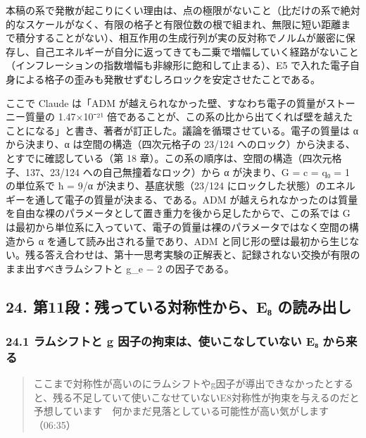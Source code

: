 \documentclass[
  a4paper,
]{ltjsarticle}
\begin{document}
本稿の系で発散が起こりにくい理由は、点の極限がないこと（比だけの系で絶対的なスケールがなく、有限の格子と有限位数の根で組まれ、無限に短い距離まで積分することがない）、相互作用の生成行列が実の反対称でノルムが厳密に保存し、自己エネルギーが自分に返ってきても二乗で増幅していく経路がないこと（インフレーションの指数増幅も非線形に飽和して止まる）、E5
で入れた電子自身による格子の歪みも発散せずむしろロックを安定させたことである。

ここで Claude は「ADM
が越えられなかった壁、すなわち電子の質量がストーニー質量の 1.47×10⁻²¹
倍であることが、この系の比から出てくれば壁を越えたことになる」と書き、著者が訂正した。議論を循環させている。電子の質量は
α から決まり、α は空間の構造（四次元格子の 23/124
へのロック）から決まる、とすでに確認している（第 18
章）。この系の順序は、空間の構造（四次元格子、137、23/124
への自己無撞着なロック）から α が決まり、G = c = q₀ = 1 の単位系で ħ =
9/α が決まり、基底状態（23/124
にロックした状態）のエネルギーを通して電子の質量が決まる、である。ADM
が越えられなかったのは質量を自由な裸のパラメータとして置き重力を後から足したからで、この系では
G
は最初から単位系に入っていて、電子の質量は裸のパラメータではなく空間の構造から
α を通して読み出される量であり、ADM
と同じ形の壁は最初から生じない。残る答え合わせは、第十一思考実験の正解表と、記録されない交換が有限のまま出すべきラムシフトと
g\_e − 2 の因子である。

\subsection{24. 第11段：残っている対称性から、E₈
の読み出し}\label{ux7b2c11ux6bb5ux6b8bux3063ux3066ux3044ux308bux5bfeux79f0ux6027ux304bux3089eux2088-ux306eux8aadux307fux51faux3057}

\subsubsection{24.1 ラムシフトと g 因子の拘束は、使いこなしていない E₈
から来る}\label{ux30e9ux30e0ux30b7ux30d5ux30c8ux3068-g-ux56e0ux5b50ux306eux62d8ux675fux306fux4f7fux3044ux3053ux306aux3057ux3066ux3044ux306aux3044-eux2088-ux304bux3089ux6765ux308b}

\begin{quote}
ここまで対称性が高いのにラムシフトやg因子が導出できなかったとすると、残る不足していて使いこなせていないE8対称性が拘束を与えるのだと予想しています　何かまだ見落としている可能性が高い気がします（06:35）
\end{quote}
\end{document}

